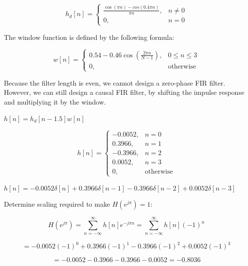 \documentclass[fleqn]{article}
\begin{document}
\begin{enumerate}[nolistsep]
		\begin{equation*}
			h_d[n] =
			\begin{cases}
				\frac{\cos{({\pi}n)} - cos{(0.4{\pi}n)}}{{\pi}n}, & n \neq 0 \\
				0, & n = 0
			\end{cases}
		\end{equation*}
		
		The window function is defined by the following formula:
		
		\begin{equation*}
			w[n] =
			\begin{cases}
				0.54 - 0.46\cos{\left(\frac{2{\pi}n}{N - 1}\right)}, & 0 \leq n \leq 3 \\
				0, & \text{otherwise}
			\end{cases}
		\end{equation*}
		
		Because the filter length is even, we cannot design a zero-phase FIR filter. However, we can still design a causal FIR filter, by shifting the impulse response and multiplying it by the window.
		
		$h[n] = h_d[n - 1.5]w[n]$
		
		\begin{equation*}
			h[n] =
			\begin{cases}
				-0.0052, & n = 0 \\
				0.3966, & n = 1 \\
				-0.3966, & n = 2 \\
				0.0052, & n = 3\\
				0, & \text{otherwise}
			\end{cases}
		\end{equation*}
			
		$h[n] = -0.0052\delta[n] + 0.3966\delta[n-1] - 0.3966\delta[n-2] + 0.0052\delta[n-3]$
		
		Determine scaling required to make $H(e^{j\pi}) = 1$:
		
		\begin{equation*}
			H(e^{j\pi}) = \sum_{n=-\infty}^{\infty}{h[n]e^{-j{\pi}n}} = \sum_{n=-\infty}^{\infty}{h[n](-1)^n}
		\end{equation*}
		
		\begin{equation*}
			= -0.0052(-1)^{0} + 0.3966(-1)^{1} - 0.3966(-1)^{2} + 0.0052(-1)^{3}
		\end{equation*}
		
		\begin{equation*}
			= -0.0052 - 0.3966 - 0.3966 - 0.0052 = -0.8036
		\end{equation*}
		

\end{enumerate}
\end{document}
